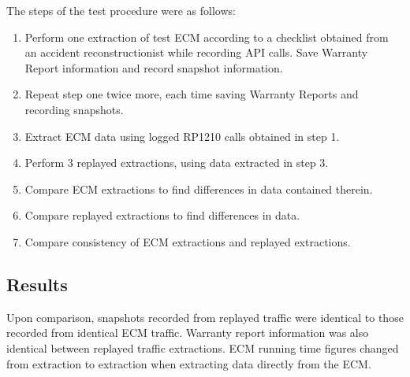 The steps of the test procedure were as follows:

\begin{enumerate}
  \item Perform one extraction of test ECM according to a checklist obtained from an accident reconstructionist while recording API calls. Save Warranty Report information and record snapshot information.
  \item Repeat step one twice more, each time saving Warranty Reports and recording snapshots.
  \item Extract ECM data using logged RP1210 calls obtained in step 1.
  \item Perform 3 replayed extractions, using data extracted in step 3.
  \item Compare ECM extractions to find differences in data contained therein.
  \item Compare replayed extractions to find differences in data.
  \item Compare consistency of ECM extractions and replayed extractions.
\end{enumerate}

\subsection{Results}

Upon comparison, snapshots recorded from replayed traffic were identical to those recorded from identical ECM traffic. Warranty report information was also identical
between replayed traffic extractions. ECM running time figures changed from extraction to extraction when extracting data directly from the ECM.
